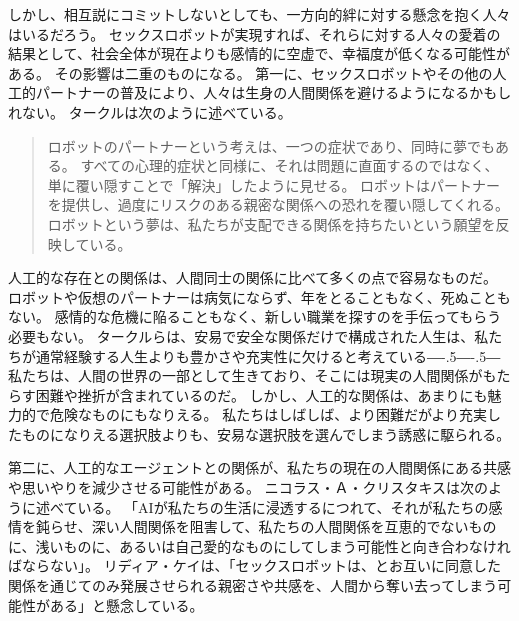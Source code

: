 \documentclass[paper=a4,book,openany]{jlreq}
\def\DDASH{―\kern-.5\zw―\kern-.5\zw―} %
\begin{document}
しかし、相互説にコミットしないとしても、一方向的絆に対する懸念を抱く人々はいるだろう。
セックスロボットが実現すれば、それらに対する人々の愛着の結果として、社会全体が現在よりも感情的に空虚で、幸福度が低くなる可能性がある。
その影響は二重のものになる。
第一に、セックスロボットやその他の人工的パートナーの普及により、人々は生身の人間関係を避けるようになるかもしれない。
タークルは次のように述べている。

\begin{quote}
ロボットのパートナーという考えは、一つの症状であり、同時に夢でもある。
すべての心理的症状と同様に、それは問題に直面するのではなく、単に覆い隠すことで「解決」したように見せる。
ロボットはパートナーを提供し、過度にリスクのある親密な関係への恐れを覆い隠してくれる。
ロボットという夢は、私たちが支配できる関係を持ちたいという願望を反映している。
\citep[p.285]{turkle11:_alone_toget}
\end{quote}

人工的な存在との関係は、人間同士の関係に比べて多くの点で容易なものだ。
ロボットや仮想のパートナーは病気にならず、年をとることもなく、死ぬこともない。
感情的な危機に陥ることもなく、新しい職業を探すのを手伝ってもらう必要もない。
タークルらは、安易で安全な関係だけで構成された人生は、私たちが通常経験する人生よりも豊かさや充実性に欠けると考えている{\DDASH}
私たちは、人間の世界の一部として生きており、そこには現実の人間関係がもたらす困難や挫折が含まれているのだ。
しかし、人工的な関係は、あまりにも魅力的で危険なものにもなりえる。
私たちはしばしば、より困難だがより充実したものになりえる選択肢よりも、安易な選択肢を選んでしまう誘惑に駆られる。

第二に、人工的なエージェントとの関係が、私たちの現在の人間関係にある共感や思いやりを減少させる可能性がある。
ニコラス・Ａ・クリスタキスは次のように述べている。
「AIが私たちの生活に浸透するにつれて、それが私たちの感情を鈍らせ、深い人間関係を阻害して、私たちの人間関係を互恵的でないものに、浅いものに、あるいは自己愛的なものにしてしまう可能性と向き合わなければならない」\citep{christakis19:_how_ai_will_rewir_us}。
リディア・ケイは、「セックスロボットは、とお互いに同意した関係を通じてのみ発展させられる親密さや共感を、人間から奪い去ってしまう可能性がある」と懸念している\citep{responsible17:_our_sexual_futur_robot}。
\end{document}

